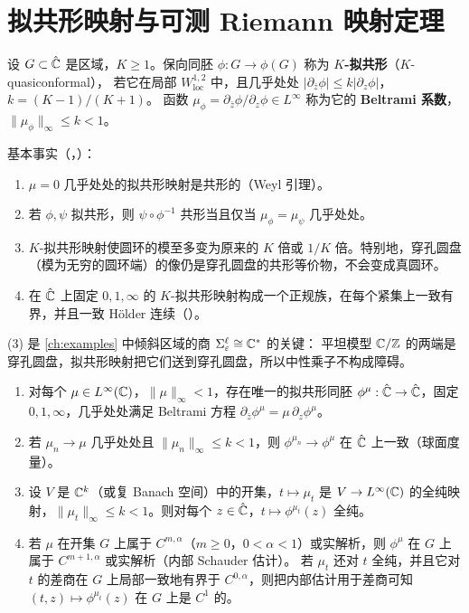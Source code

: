 \section{拟共形映射与可测 Riemann 映射定理}\label{appA:sec:qc}

\begin{definition}\label{appA:def:qc}
设 $G\subset\hat{\mathbb{C}}$ 是区域，$K\ge1$。保向同胚 $\phi:G\to\phi(G)$ 称为 \textbf{$K$-拟共形}（$K$-quasiconformal），
若它在局部 $W^{1,2}_{\mathrm{loc}}$ 中，且几乎处处 $|\partial_{\bar z}\phi|\le k|\partial_z\phi|$，$k=(K-1)/(K+1)$。
函数 $\mu_\phi=\partial_{\bar z}\phi/\partial_z\phi\in L^\infty$ 称为它的 \textbf{Beltrami 系数}，$\|\mu_\phi\|_\infty\le k<1$。
\end{definition}

基本事实（\cite[第~I~章]{AhlforsLectures}，\cite[第~IV~章]{LehtoVirtanen}）：
\begin{enumerate}
\item $\mu=0$ 几乎处处的拟共形映射是共形的（Weyl 引理）。
\item 若 $\phi,\psi$ 拟共形，则 $\psi\circ\phi^{-1}$ 共形当且仅当 $\mu_\phi=\mu_\psi$ 几乎处处。
\item $K$-拟共形映射使圆环的模至多变为原来的 $K$ 倍或 $1/K$ 倍。特别地，穿孔圆盘（模为无穷的圆环端）的像仍是穿孔圆盘的共形等价物，不会变成真圆环。
\item 在 $\hat{\mathbb{C}}$ 上固定 $0,1,\infty$ 的 $K$-拟共形映射构成一个正规族，在每个紧集上一致有界，并且一致 Hölder 连续（\cite[第~II~章]{LehtoVirtanen}）。
\end{enumerate}

(3) 是 \cref{ch:examples} 中倾斜区域的商 $\Sigma^\ell_\varepsilon\cong\mathbb{C}^*$ 的关键：
平坦模型 $\mathbb{C}/\mathbb{Z}$ 的两端是穿孔圆盘，拟共形映射把它们送到穿孔圆盘，所以中性乘子不构成障碍。

\begin{theorem}\label{thm:ahlfors-bers}
\leavevmode
\begin{enumerate}
\item 对每个 $\mu\in L^\infty(\mathbb{C})$，$\|\mu\|_\infty<1$，存在唯一的拟共形同胚 $\phi^\mu:\hat{\mathbb{C}}\to\hat{\mathbb{C}}$，固定 $0,1,\infty$，几乎处处满足 Beltrami 方程
  $\partial_{\bar z}\phi^\mu=\mu\,\partial_z\phi^\mu$。
\item 若 $\mu_n\to\mu$ 几乎处处且 $\|\mu_n\|_\infty\le k<1$，则 $\phi^{\mu_n}\to\phi^\mu$ 在 $\hat{\mathbb{C}}$ 上一致（球面度量）。
\item 设 $V$ 是 $\mathbb{C}^k$（或复 Banach 空间）中的开集，$t\mapsto\mu_t$ 是 $V\to L^\infty(\mathbb{C})$ 的全纯映射，$\|\mu_t\|_\infty\le k<1$。则对每个 $z\in\hat{\mathbb{C}}$，$t\mapsto\phi^{\mu_t}(z)$ 全纯。
\item 若 $\mu$ 在开集 $G$ 上属于 $C^{m,\alpha}$（$m\ge0$，$0<\alpha<1$）或实解析，则 $\phi^\mu$ 在 $G$ 上属于 $C^{m+1,\alpha}$ 或实解析（内部 Schauder 估计）。
  若 $\mu_t$ 还对 $t$ 全纯，并且它对 $t$ 的差商在 $G$ 上局部一致地有界于 $C^{0,\alpha}$，则把内部估计用于差商可知 $(t,z)\mapsto\phi^{\mu_t}(z)$ 在 $G$ 上是 $C^1$ 的。
\end{enumerate}
\end{theorem}


